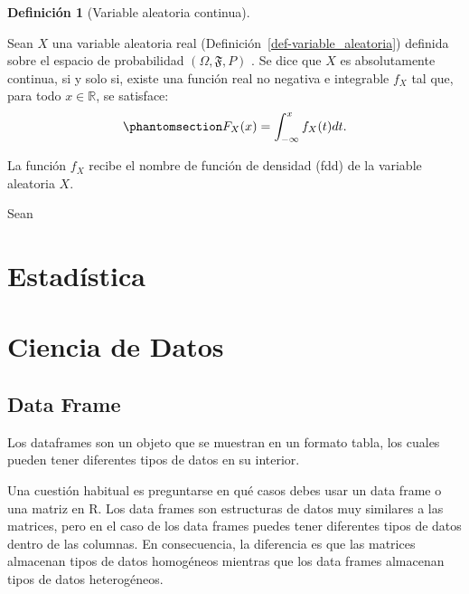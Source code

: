 \documentclass[
  us-letterpaper,
]{scrreprt}
\theoremstyle{plain}
\theoremstyle{plain}
\theoremstyle{definition}
\newtheorem{definition}{Definición}[chapter]
\theoremstyle{remark}
\begin{document}
\begin{definition}[Variable aleatoria
continua]\protect\hypertarget{def-var_alea_cont}{}\label{def-var_alea_cont}

Sean \(X\) una variable aleatoria real
(Definición~\ref{def-variable_aleatoria}) definida sobre el espacio de
probabilidad \((\Omega, \mathfrak{F}, P)\) . Se dice que \(X\) es
absolutamente continua, si y solo si, existe una función real no
negativa e integrable \(f_X\) tal que, para todo \(x \in \mathbb{R}\),
se satisface:
\begin{equation}\phantomsection\label{eq-var_ale_con}{F_X(x) = \int_{-\infty}^x f_X(t)dt.}\end{equation}

La función \(f_X\) recibe el nombre de función de densidad (fdd) de la
variable aleatoria \(X\).

\end{definition}

\begin{tcolorbox}[enhanced jigsaw, opacityback=0, colback=white, breakable, colbacktitle=quarto-callout-caution-color!10!white, bottomtitle=1mm, leftrule=.75mm, rightrule=.15mm, title={Ejemplo (\textbf{\emph{Variable aleatoria continua}})}, titlerule=0mm, left=2mm, bottomrule=.15mm, opacitybacktitle=0.6, colframe=quarto-callout-caution-color-frame, toptitle=1mm, arc=.35mm, coltitle=black, toprule=.15mm]

Sean

\end{tcolorbox}

\chapter{Estadística}\label{estaduxedstica}

\chapter{Ciencia de Datos}\label{ciencia-de-datos}

\section{Data Frame}\label{sec-dataframe}

Los dataframes son un objeto que se muestran en un formato tabla, los
cuales pueden tener diferentes tipos de datos en su interior.

Una cuestión habitual es preguntarse en qué casos debes usar un data
frame o una matriz en R. Los data frames son estructuras de datos muy
similares a las matrices, pero en el caso de los data frames puedes
tener diferentes tipos de datos dentro de las columnas. En consecuencia,
la diferencia es que las matrices almacenan tipos de datos homogéneos
mientras que los data frames almacenan tipos de datos heterogéneos.
\end{document}
